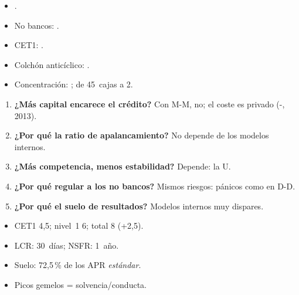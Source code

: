 \documentclass{article}
\begin{document}
\begin{columnas}
\anexorepaso
{}
\begin{itemize}
\item {}.
\item No bancos: .
\item CET1: .
\item Colchón anticíclico: .
\item Concentración: ; de 45~cajas a 2.
\end{itemize}
\begin{enumerate}
\item \textbf{¿Más capital encarece el crédito?} Con M-M, no; el coste es privado (-, 2013).
\item \textbf{¿Por qué la ratio de apalancamiento?} No depende de los modelos internos.
\item \textbf{¿Más competencia, menos estabilidad?} Depende: la U.
\item \textbf{¿Por qué regular a los no bancos?} Mismos riesgos: pánicos como en D-D.
\item \textbf{¿Por qué el suelo de resultados?} Modelos internos muy dispares.
\end{enumerate}
\begin{trampa}
\begin{itemize}
\item CET1 4,5; nivel~1 6; total 8 (+2,5).
\item LCR: 30~días; NSFR: 1~año.
\item Suelo: 72,5\,\% de los APR \emph{estándar}.
\item Picos gemelos = solvencia/conducta.
\end{itemize}
\end{trampa}

\end{columnas}
\end{document}

